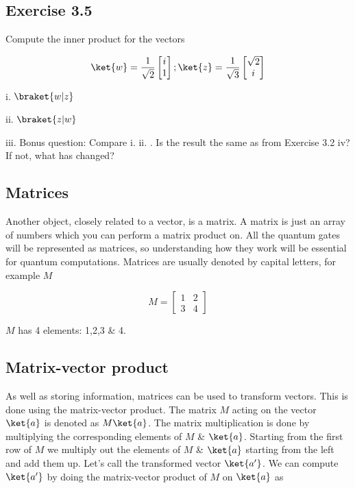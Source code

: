 \documentclass{book}
\begin{document}
\subsection{Exercise 3.5}

Compute the inner product for the vectors 

$$ \ket{w} = \frac{1}{\sqrt{2}} \begin{bmatrix} i \\ 1 \end{bmatrix} ; \ket{z} = \frac{1}{\sqrt{3}} \begin{bmatrix} \sqrt{2} \\ i \end{bmatrix}$$

i. $\braket{w|z}$

ii. $\braket{z|w}$

iii. Bonus question: Compare i. ii. . Is the result the same as from Exercise 3.2 iv? 
If not, what has changed?



\subsection{ Matrices}

Another object, closely related to a vector, is a matrix. A matrix is just an array of numbers which you can perform a matrix product on. All the quantum gates will be represented as matrices, so understanding how they work will be essential for quantum computations. Matrices are usually denoted by capital letters, for example $M$

$$
M = \begin{bmatrix} 1 & 2  \\ 3 & 4 \end{bmatrix}
$$

$M$ has 4 elements: 1,2,3 \& 4. 

\subsection{ Matrix-vector product} 

As well as storing information, matrices can be used to transform vectors. This is done using the matrix-vector product. The matrix $M$ acting on the vector $\ket{a}$ is denoted as $M\ket{a}$. The matrix multiplication is done by multiplying the corresponding elements of $M$ \& $\ket{a}$. Starting from the first row of $M$ we multiply out the elements of $M$ \& $\ket{a}$ starting from the left and add them up. Let's call the transformed vector $\ket{a'}$. We can compute $\ket{a'}$ by doing the matrix-vector product of $M$ on $\ket{a}$ as
\end{document}
